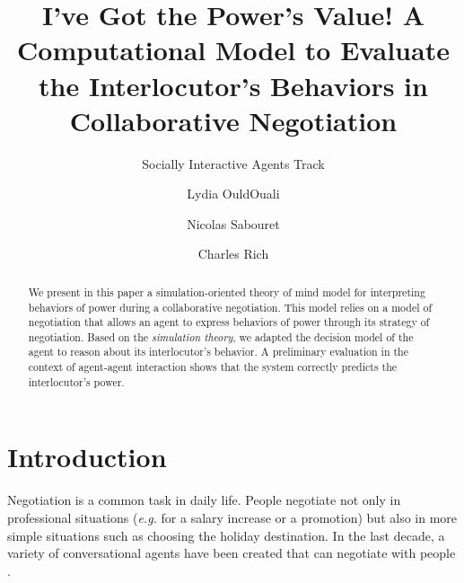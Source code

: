 \documentclass[sigconf]{aamas}  %
\begin{document}
	\title{I've Got the Power's Value! A Computational Model to Evaluate the Interlocutor's Behaviors in Collaborative Negotiation}  %
	
	\subtitle{Socially Interactive Agents Track}
	
	
	
	
	\author{Lydia OuldOuali}
	
	\author{Nicolas Sabouret}
	
	
	\author{Charles Rich}
	
	
	
	\begin{abstract}  %
		We present in this paper a simulation-oriented theory of mind model for interpreting behaviors of power during a collaborative negotiation. This model relies on a model of negotiation that allows an agent to express behaviors of power through its strategy of negotiation. Based on the \emph{simulation theory}, we adapted the decision model of the agent to reason about its interlocutor's behavior. A preliminary evaluation in the context of agent-agent interaction shows that the system correctly predicts the interlocutor's power.
	\end{abstract}
	
	
	
	\maketitle
	
	
	\section{Introduction}
	
	Negotiation is a common task in daily life. People negotiate not only in professional situations (\emph{e.g.} for a salary increase or a promotion) but also in more simple situations such as choosing the holiday destination. In the last decade, a variety of conversational agents have been created that can negotiate with people \cite{pynadath2013you,gratch2016misrepresentation,klatt2011negotiations}.
	
\end{document}
